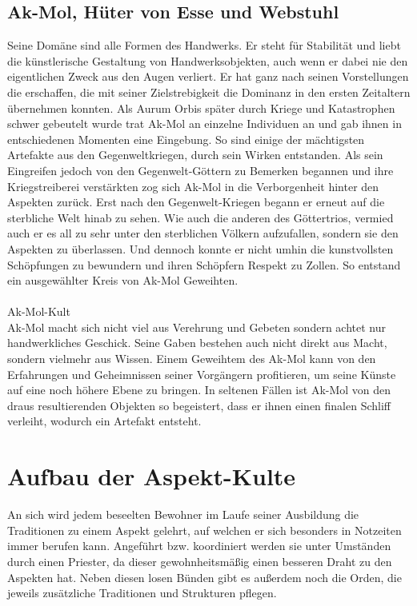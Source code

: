 \documentclass[a4paper,12pt,oneside]{book}
\begin{document}
\subsection{Ak-Mol, Hüter von Esse und Webstuhl}\label{Ak-Mol}
Seine Domäne sind alle Formen des Handwerks. Er steht für Stabilität und liebt die künstlerische Gestaltung von Handwerksobjekten, auch wenn er dabei nie den eigentlichen Zweck aus den Augen verliert. Er hat ganz nach seinen Vorstellungen die erschaffen, die mit seiner Zielstrebigkeit die Dominanz in den ersten Zeitaltern übernehmen konnten. Als Aurum Orbis später durch Kriege und Katastrophen schwer gebeutelt wurde trat Ak-Mol an einzelne Individuen an und gab ihnen in entschiedenen Momenten eine Eingebung. So sind einige der mächtigsten Artefakte aus den Gegenweltkriegen, durch sein Wirken entstanden. Als sein Eingreifen jedoch von den Gegenwelt-Göttern zu Bemerken begannen und ihre Kriegstreiberei verstärkten zog sich Ak-Mol in die Verborgenheit hinter den Aspekten zurück. Erst nach den Gegenwelt-Kriegen begann er erneut auf die sterbliche Welt hinab zu sehen. Wie auch die anderen des Göttertrios, vermied auch er es all zu sehr unter den sterblichen Völkern aufzufallen, sondern sie den Aspekten zu überlassen.  Und dennoch konnte er nicht umhin die kunstvollsten Schöpfungen zu bewundern und ihren Schöpfern Respekt zu Zollen. So entstand ein ausgewählter Kreis von Ak-Mol Geweihten.
\\\\\large Ak-Mol-Kult
\\\normalsize Ak-Mol macht sich nicht viel aus Verehrung und Gebeten sondern achtet nur handwerkliches Geschick. Seine Gaben bestehen auch nicht direkt aus Macht, sondern vielmehr aus Wissen. Einem Geweihtem des Ak-Mol kann von den Erfahrungen und Geheimnissen seiner Vorgängern profitieren, um seine Künste auf eine noch höhere Ebene zu bringen. In seltenen Fällen ist Ak-Mol von den draus resultierenden Objekten so begeistert, dass er ihnen einen finalen Schliff verleiht, wodurch ein Artefakt entsteht.

\section{Aufbau der Aspekt-Kulte}
An sich wird jedem beseelten Bewohner im Laufe seiner Ausbildung die Traditionen zu einem Aspekt gelehrt, auf welchen er sich besonders in Notzeiten immer berufen kann. Angeführt bzw. koordiniert werden sie unter Umständen durch einen Priester, da dieser gewohnheitsmäßig einen besseren Draht zu den Aspekten hat. Neben diesen losen Bünden gibt es außerdem noch die Orden, die jeweils zusätzliche Traditionen und Strukturen pflegen.
\end{document}
